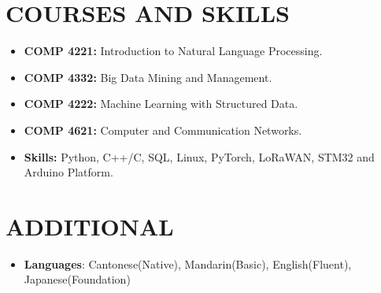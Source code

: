 \documentclass[10pt,a4paper,roman]{moderncv}        %
\begin{document}
\section{COURSES AND SKILLS}
\begin{itemize}
  \item \textbf{COMP 4221:} Introduction to Natural Language Processing.
  \vspace{0.2cm}
  \item \textbf{COMP 4332:} Big Data Mining and Management.
  \vspace{0.2cm}
  \item \textbf{COMP 4222:} Machine Learning with Structured Data.
  \vspace{0.2cm}
  \item \textbf{COMP 4621:} Computer and Communication Networks.
  \vspace{0.2cm}
  \item \textbf{Skills:} Python, C++/C, SQL, Linux, PyTorch, LoRaWAN, STM32 and Arduino Platform.
\end{itemize}

\section{ADDITIONAL}
\begin{itemize}
  \item \textbf{Languages}: Cantonese(Native), Mandarin(Basic), English(Fluent), Japanese(Foundation)
\end{itemize}
\end{document}
